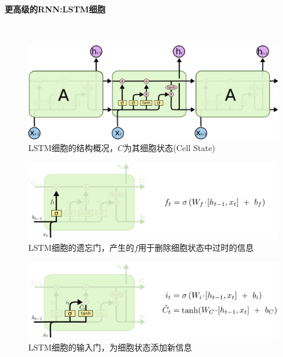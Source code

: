 \paragraph{更高级的RNN:LSTM细胞}\ \par
\begin{figure}[htbp!]
    \centering
    \includegraphics[width = 1.\textwidth]{chap/img/LSTM3-chain.png}
    \caption{
        LSTM细胞的结构概况，$C$为其细胞状态(Cell State)\supercite{Understanding-LSTMs}
        }\label{fig:lstm_cell}
\end{figure}
\par
\begin{figure}[htbp!]
    \centering
    \includegraphics[width = 1.\textwidth]{chap/img/LSTM3-focus-f.png}
    \caption{
        LSTM细胞的遗忘门，产生的$f$用于删除细胞状态中过时的信息\supercite{Understanding-LSTMs}
        }\label{fig:lstm_f}
\end{figure}
\par
\begin{figure}[htbp!]
    \centering
    \includegraphics[width = 1.\textwidth]{chap/img/LSTM3-focus-i.png}
    \caption{
        LSTM细胞的输入门，为细胞状态添加新信息\supercite{Understanding-LSTMs}
        }\label{fig:lstm_i}
\end{figure}
